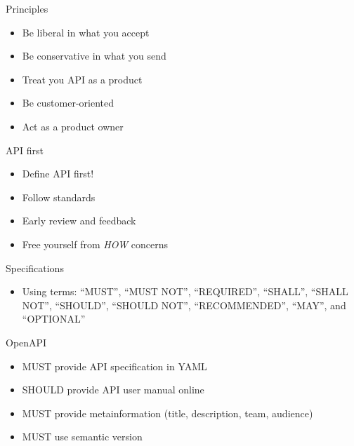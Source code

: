 \begin{frame}{Principles}
\protect\hypertarget{principles}{}

\begin{itemize}
\tightlist
\item
  Be liberal in what you accept
\item
  Be conservative in what you send
\item
  Treat you API as a product
\item
  Be customer-oriented
\item
  Act as a product owner
\end{itemize}

\end{frame}

\begin{frame}{API first}
\protect\hypertarget{api-first}{}

\begin{itemize}
\tightlist
\item
  Define API first!
\item
  Follow standards
\item
  Early review and feedback
\item
  Free yourself from \emph{HOW} concerns
\end{itemize}

\end{frame}

\begin{frame}{Specifications}
\protect\hypertarget{specifications}{}

\begin{itemize}
\tightlist
\item
  Using terms: ``MUST'', ``MUST NOT'', ``REQUIRED'', ``SHALL'', ``SHALL
  NOT'', ``SHOULD'', ``SHOULD NOT'', ``RECOMMENDED'', ``MAY'', and
  ``OPTIONAL''
\end{itemize}

\end{frame}

\begin{frame}{OpenAPI}
\protect\hypertarget{openapi}{}

\begin{itemize}
\tightlist
\item
  MUST provide API specification in YAML
\item
  SHOULD provide API user manual online
\item
  MUST provide metainformation (title, description, team, audience)
\item
  MUST use semantic version
\end{itemize}

\end{frame}

